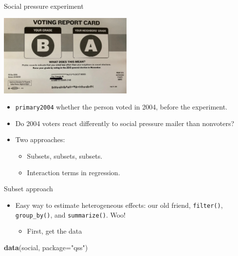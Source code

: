\documentclass[
  ignorenonframetext,
]{beamer}
\newenvironment{Shaded}{\begin{snugshade}}{\end{snugshade}}
\newcommand{\AttributeTok}[1]{\textcolor[rgb]{0.13,0.29,0.53}{#1}}
\newcommand{\FunctionTok}[1]{\textcolor[rgb]{0.13,0.29,0.53}{\textbf{#1}}}
\newcommand{\NormalTok}[1]{#1}
\newcommand{\StringTok}[1]{\textcolor[rgb]{0.31,0.60,0.02}{#1}}
\providecommand{\tightlist}{%
  \setlength{\itemsep}{0pt}\setlength{\parskip}{0pt}}
\begin{document}
\begin{frame}[fragile]{Social pressure experiment}
\label{social-pressure-experiment}
\centering

\includegraphics[width=0.5\textwidth,height=\textheight]{figs/socialpressure.png}

\pause

\begin{itemize}
\tightlist
\item
  \texttt{primary2004} whether the person voted in 2004, before the
  experiment. \pause
\item
  Do 2004 voters react differently to social pressure mailer than
  nonvoters? \pause
\item
  Two approaches: \pause

  \begin{itemize}
  \tightlist
  \item
    Subsets, subsets, subsets. \pause
  \item
    Interaction terms in regression.
  \end{itemize}
\end{itemize}
\end{frame}

\begin{frame}[fragile]{Subset approach}
\label{subset-approach}
\pause

\begin{itemize}
\tightlist
\item
  Easy way to estimate heterogeneous effects: our old friend,
  \texttt{filter()}, \texttt{group\_by()}, and \texttt{summarize()}.
  Woo! \pause

  \begin{itemize}
  \tightlist
  \item
    First, get the data
  \end{itemize}
\end{itemize}

\begin{Shaded}
\begin{Highlighting}[]
\FunctionTok{data}\NormalTok{(social, }\AttributeTok{package=}\StringTok{"qss"}\NormalTok{) }
\end{Highlighting}
\end{Shaded}
\end{frame}
\end{document}
